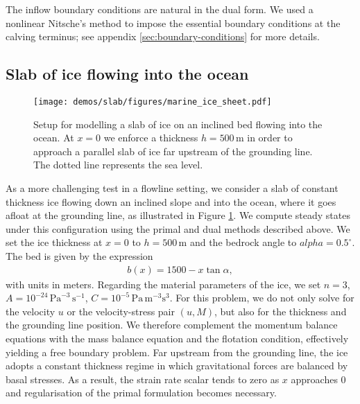 \documentclass{article}
\theoremstyle{definition}
\theoremstyle{plain}
\begin{document}
The inflow boundary conditions are natural in the dual form.
We used a nonlinear Nitsche's method to impose the essential boundary conditions at the calving terminus; see appendix \ref{sec:boundary-conditions} for more details.

\subsection{Slab of ice flowing into the ocean}

\begin{figure}[t]
\centering
	\texttt{[image: demos/slab/figures/marine\_ice\_sheet.pdf]}
	\caption{Setup for modelling a slab of ice on an inclined bed flowing into the ocean. At $x = 0$ we enforce a thickness $h = 500\,\mathrm{m}$ in order to approach a parallel slab of ice far upstream of the grounding line. The dotted line represents the sea level.}
	\label{fig:domain_parallel_slab}
\end{figure} 

As a more challenging test in a flowline setting, we consider a slab of constant thickness ice flowing down an inclined slope and into the ocean, where it goes afloat at the grounding line, as illustrated in Figure \ref{fig:domain_parallel_slab}. We compute steady states under this configuration using the primal and dual methods described above. We set the ice thickness at $x = 0$ to $h = 500\, \mathrm{m}$ and the bedrock angle to $alpha = 0.5^\circ$. The bed is given by the expression
%
\begin{align}
	b(x) = 1500 - x\tan{\alpha},
\end{align} 
%
with units in meters. Regarding the material parameters of the ice, we set $n = 3$, $A = 10^{-24}\,\mathrm{Pa}^{-3}\,\mathrm{s}^{-1}$, $C = 10^{-5}\,\mathrm{Pa}\,\mathrm{m}^{-3}\mathrm{s}^3$. For this problem, we do not only solve for the velocity $u$ or the velocity-stress pair $(u,M)$, but also for the thickness and the grounding line position. We therefore complement the momentum balance equations with the mass balance equation and the flotation condition, effectively yielding a free boundary problem. Far upstream from the grounding line, the ice adopts a constant thickness regime in which gravitational forces are balanced by basal stresses. As a result, the strain rate scalar tends to zero as $x$ approaches 0 and regularisation of the primal formulation becomes necessary. 
\end{document}
